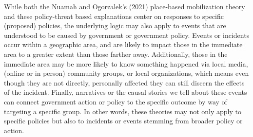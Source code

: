 \documentclass[12pt]{article}
\newcommand{\kscomment}[1]{\textbf{\textcolor{Thistle}{[[ #1 --- KS ]]}}}
\begin{document}

While both the Nuamah and Ogorzalek's (2021) place-based mobilization theory and these policy-threat based explanations center on responses to specific (proposed) policies, the underlying logic may also apply to events that are understood to be caused by government or government policy. Events or incidents occur within a geographic area, and are likely to impact those in the immediate area to a greater extent than those farther away. Additionally, those in the immediate area may be more likely to know something happened via local media, (online or in person) community groups, or local organizations, which means even though they are not directly, personally affected they can still discern the effects of the incident. Finally, narratives or the causal stories we tell about these events can connect government action or policy to the specific outcome by way of targeting a specific group. 
In other words, these theories may not only apply to specific policies but also to incidents or events stemming from broader policy or action. 
\end{document}
